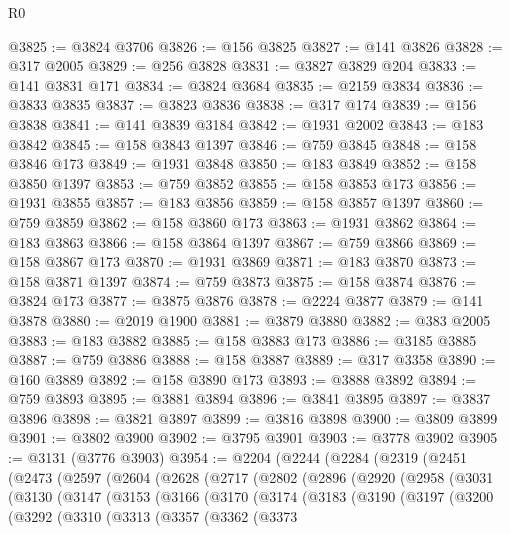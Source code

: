 \begin{lexlean}{R0}
\begin{coremodule}
@3825 := @3824 @3706
@3826 := @156 @3825
@3827 := @141 @3826
@3828 := @317 @2005
@3829 := @256 @3828
@3831 := @3827 @3829 @204
@3833 := @141 @3831 @171
@3834 := @3824 @3684
@3835 := @2159 @3834
@3836 := @3833 @3835
@3837 := @3823 @3836
@3838 := @317 @174
@3839 := @156 @3838
@3841 := @141 @3839 @3184
@3842 := @1931 @2002
@3843 := @183 @3842
@3845 := @158 @3843 @1397
@3846 := @759 @3845
@3848 := @158 @3846 @173
@3849 := @1931 @3848
@3850 := @183 @3849
@3852 := @158 @3850 @1397
@3853 := @759 @3852
@3855 := @158 @3853 @173
@3856 := @1931 @3855
@3857 := @183 @3856
@3859 := @158 @3857 @1397
@3860 := @759 @3859
@3862 := @158 @3860 @173
@3863 := @1931 @3862
@3864 := @183 @3863
@3866 := @158 @3864 @1397
@3867 := @759 @3866
@3869 := @158 @3867 @173
@3870 := @1931 @3869
@3871 := @183 @3870
@3873 := @158 @3871 @1397
@3874 := @759 @3873
@3875 := @158 @3874
@3876 := @3824 @173
@3877 := @3875 @3876
@3878 := @2224 @3877
@3879 := @141 @3878
@3880 := @2019 @1900
@3881 := @3879 @3880
@3882 := @383 @2005
@3883 := @183 @3882
@3885 := @158 @3883 @173
@3886 := @3185 @3885
@3887 := @759 @3886
@3888 := @158 @3887
@3889 := @317 @3358
@3890 := @160 @3889
@3892 := @158 @3890 @173
@3893 := @3888 @3892
@3894 := @759 @3893
@3895 := @3881 @3894
@3896 := @3841 @3895
@3897 := @3837 @3896
@3898 := @3821 @3897
@3899 := @3816 @3898
@3900 := @3809 @3899
@3901 := @3802 @3900
@3902 := @3795 @3901
@3903 := @3778 @3902
@3905 := @3131 (@3776 @3903)
@3954 := @2204
    (@2244
      (@2284
        (@2319
          (@2451
            (@2473
              (@2597
                (@2604
                  (@2628
                    (@2717
                      (@2802
                        (@2896
                          (@2920
                            (@2958
                              (@3031
                                (@3130
                                  (@3147
                                    (@3153
                                      (@3166
                                        (@3170
                                          (@3174
                                            (@3183
                                              (@3190
                                                (@3197
                                                  (@3200
                                                    (@3292
                                                      (@3310
                                                        (@3313
                                                          (@3357
                                                            (@3362
                                                              (@3373

\end{coremodule}
\end{lexlean}
